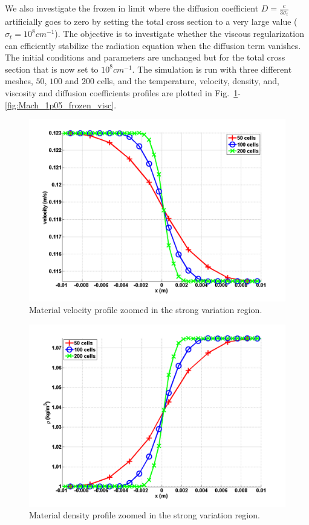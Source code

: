 \documentclass[review]{elsarticle}
\newcommand{\fig}[1]{Fig.~\ref{#1}}                      %
\begin{document}
We also investigate the frozen in limit where the diffusion coefficient $D = \frac{c}{3\sigma_t}$ artificially goes to zero by setting the total cross section to a very large value ($\sigma_t = 10^8 cm^{-1}$). The objective is to investigate whether the viscous regularization can efficiently stabilize the radiation equation when the diffusion term vanishes. The initial conditions and parameters are unchanged but for the total cross section that is now set to $10^8 cm^{-1}$. The simulation is run with three different meshes, $50$, $100$ and $200$ cells, and the temperature, velocity, density, and, viscosity and diffusion coefficients profiles are plotted in \fig{fig:Mach_1p05_frozen_density}-\ref{fig:Mach_1p05_frozen_visc}.
%
\begin{figure}[H]
        \centering
        \includegraphics[width=\textwidth]{Mach_1p05_zoom_in_velocity.png}
        \caption{Material velocity profile zoomed in the strong variation region.}
        \label{fig:Mach_1p05_frozen_density}
\end{figure}%
\begin{figure}[H]
            \centering
            \includegraphics[width=\textwidth]{Mach_1p05_zoom_in_density.png}
            \caption{Material density profile zoomed in the strong variation region.}
            \label{fig:Mach_1p05_frozen_velocity}
\end{figure}
\end{document}
